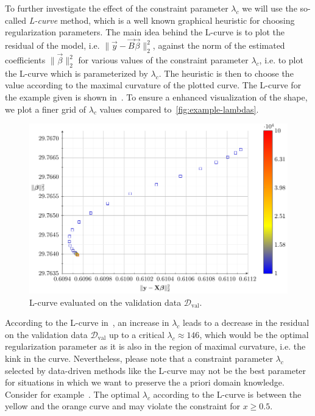 To further investigate the effect of the constraint parameter $\lambda_c$ we will use the so-called \emph{L-curve} method, which is a well known graphical heuristic for choosing regularization parameters. The main idea behind the L-curve is to plot the residual of the model, i.e. $\lVert \vec{y} - \vec{B} \vec{\beta} \lVert_2^2$, against the norm of the estimated coefficients $\lVert \vec{\beta} \rVert_2^2$ for various values of the constraint parameter $\lambda_c$, i.e. to plot the L-curve which is parameterized by $\lambda_c$. The heuristic is then to choose the value according to the maximal curvature of the plotted curve. The L-curve for the example given is shown in~. To ensure a enhanced visualization of the shape, we plot a finer grid of $\lambda_c$ values compared to~\ref{fig:example-lambdas}.

\begin{figure}[H]
	\centering
	\includegraphics{graphics/pgfplots/cha4/exp-Lcurve.pdf}
	\caption{L-curve evaluated on the validation data $\mathcal{D}_{\mathrm{val}}$.}
	\label{fig:example-lcurve}
\end{figure}
According to the L-curve in~, an increase in $\lambda_c$ leads to a decrease in the residual on the validation data $\mathcal{D}_{\mathrm{val}}$ up to a critical $\lambda_c \approx 146$, which would be the optimal regularization parameter as it is also in the region of maximal curvature, i.e. the kink in the curve. Nevertheless, please note that a constraint parameter $\lambda_c$ selected by data-driven methods like the L-curve may not be the best parameter for situations in which we want to preserve the a priori domain knowledge. Consider for example~. The optimal $\lambda_c$ according to the L-curve is between the yellow and the orange curve and may violate the constraint for $x \ge 0.5$. 

